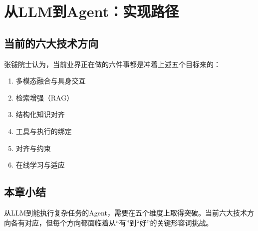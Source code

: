 \section{从LLM到Agent：实现路径}

\subsection{当前的六大技术方向}

张钹院士认为，当前业界正在做的六件事都是冲着上述五个目标来的：

\begin{enumerate}
\item 多模态融合与具身交互
\item 检索增强（RAG）
\item 结构化知识对齐
\item 工具与执行的绑定
\item 对齐与约束
\item 在线学习与适应
\end{enumerate}

\subsection{本章小结}

从LLM到能执行复杂任务的Agent，需要在五个维度上取得突破。当前六大技术方向各有对应，但每个方向都面临着从``有''到``好''的关键形容词挑战。



